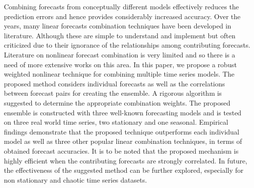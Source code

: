 Combining forecasts from conceptually different models effectively reduces the prediction errors and hence provides
considerably increased accuracy. Over the years, many linear forecasts combination techniques have been developed in literature. Although these are simple to understand and implement but often criticized due to their ignorance of the relationships among contributing forecasts. Literature on nonlinear forecast combination is very limited and so there is a need of more extensive works on this area. In this paper, we propose a robust weighted nonlinear
technique for combining multiple time series models. The proposed method considers individual forecasts as well as the correlations between forecast pairs for creating the ensemble. A rigorous algorithm is suggested to determine the appropriate combination weights. The proposed ensemble is constructed with three well-known forecasting models and is tested on three real world time series, two stationary and one seasonal. Empirical findings demonstrate that the proposed technique outperforms each individual model as well as three other popular linear combination techniques, in terms of obtained forecast accuracies. It is to be noted that the proposed mechanism is highly efficient when the contributing forecasts are strongly correlated. In future, the effectiveness of the suggested method can be further explored, especially for non stationary and chaotic time series datasets. 
